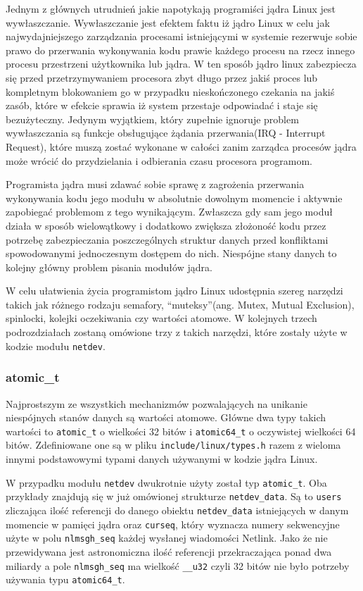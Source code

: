Jednym z głównych utrudnień jakie napotykają programiści jądra Linux
jest wywłaszczanie. Wywłaszczanie jest efektem faktu iż jądro Linux w
celu jak najwydajniejszego zarządzania procesami istniejącymi w systemie
rezerwuje sobie prawo do przerwania wykonywania kodu prawie każdego
procesu na rzecz innego procesu przestrzeni użytkownika lub jądra. W ten
sposób jądro linux zabezpiecza się przed przetrzymywaniem procesora zbyt
długo przez jakiś proces lub kompletnym blokowaniem go w przypadku
nieskończonego czekania na jakiś zasób, które w efekcie sprawia iż
system przestaje odpowiadać i staje się bezużyteczny. Jedynym wyjątkiem,
który zupełnie ignoruje problem wywłaszczania są funkcje obsługujące
żądania przerwania(IRQ - Interrupt Request), które muszą zostać wykonane
w całości zanim zarządca procesów jądra może wrócić do przydzielania i
odbierania czasu procesora programom.

Programista jądra musi zdawać sobie sprawę z zagrożenia przerwania
wykonywania kodu jego modułu w absolutnie dowolnym momencie i aktywnie
zapobiegać problemom z tego wynikającym. Zwłaszcza gdy sam jego moduł
działa w sposób wielowątkowy i dodatkowo zwiększa złożoność kodu przez
potrzebę zabezpieczania poszczególnych struktur danych przed konfliktami
spowodowanymi jednoczesnym dostępem do nich. Niespójne stany danych to
kolejny główny problem pisania modułów jądra.

W celu ułatwienia życia programistom jądro Linux udostępnia szereg
narzędzi takich jak różnego rodzaju semafory, ``muteksy''(ang. Mutex,
Mutual Exclusion), spinlocki, kolejki oczekiwania czy wartości atomowe.
W kolejnych trzech podrozdziałach zostaną omówione trzy z takich
narzędzi, które zostały użyte w kodzie modułu \texttt{netdev}.

\subsubsection{atomic\_t}

Najprostszym ze wszystkich mechanizmów pozwalających na unikanie
niespójnych stanów danych są wartości atomowe. Główne dwa typy takich
wartości to \texttt{atomic\_t} o wielkości 32 bitów i
\texttt{atomic64\_t} o oczywistej wielkości 64 bitów. Zdefiniowane one
są w pliku \texttt{include/linux/types.h} razem z wieloma innymi
podstawowymi typami danych używanymi w kodzie jądra Linux.

W przypadku modułu \texttt{netdev} dwukrotnie użyty został typ
\texttt{atomic\_t}. Oba przykłady znajdują się w już omówionej
strukturze \texttt{netdev\_data}. Są to \texttt{users} zliczająca ilość
referencji do danego obiektu \texttt{netdev\_data} istniejących w danym
momencie w pamięci jądra oraz \texttt{curseq}, który wyznacza numery
sekwencyjne użyte w polu \texttt{nlmsgh\_seq} każdej wysłanej wiadomości
Netlink. Jako że nie przewidywana jest astronomiczna ilość referencji
przekraczająca ponad dwa miliardy a pole \texttt{nlmsgh\_seq} ma
wielkość \texttt{\_\_u32} czyli 32 bitów nie było potrzeby używania typu
\texttt{atomic64\_t}.

